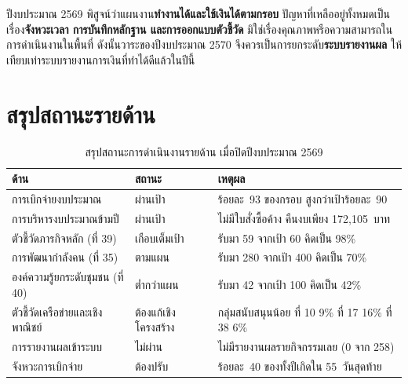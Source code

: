 \begin{tipbox}
ปีงบประมาณ 2569 พิสูจน์ว่าแผนงาน\textbf{ทำงานได้และใช้เงินได้ตามกรอบ}
ปัญหาที่เหลืออยู่ทั้งหมดเป็นเรื่อง\textbf{จังหวะเวลา การบันทึกหลักฐาน และการออกแบบตัวชี้วัด}
มิใช่เรื่องคุณภาพหรือความสามารถในการดำเนินงานในพื้นที่
ดังนั้นวาระของปีงบประมาณ 2570 จึงควรเป็นการยกระดับ\textbf{ระบบรายงานผล}
ให้เทียบเท่าระบบรายงานการเงินที่ทำได้ดีแล้วในปีนี้
\end{tipbox}

\section{สรุปสถานะรายด้าน}

\begin{table}[H]
\centering
\caption{สรุปสถานะการดำเนินงานรายด้าน เมื่อปิดปีงบประมาณ 2569}
\small
\begin{tabular}{L{4.0cm}L{2.3cm}L{7.1cm}}
\toprule
{}
\textbf{ด้าน} & \textbf{สถานะ} & \textbf{เหตุผล}\\
\midrule
การเบิกจ่ายงบประมาณ & ผ่านเป้า & ร้อยละ~93 ของกรอบ สูงกว่าเป้าร้อยละ~90\\
การบริหารงบประมาณข้ามปี & ผ่านเป้า & ไม่มีใบสั่งซื้อค้าง คืนงบเพียง 172,105~บาท\\
ตัวชี้วัดภารกิจหลัก (ที่ 39) & เกือบเต็มเป้า & รับมา 59 จากเป้า 60 คิดเป็น 98\%\\
การพัฒนากำลังคน (ที่ 35) & ตามแผน & รับมา 280 จากเป้า 400 คิดเป็น 70\%\\
องค์ความรู้ยกระดับชุมชน (ที่ 40) & ต่ำกว่าแผน & รับมา 42 จากเป้า 100 คิดเป็น 42\%\\
ตัวชี้วัดเครือข่ายและเชิงพาณิชย์ & ต้องแก้เชิงโครงสร้าง & กลุ่มสนับสนุนน้อย ที่ 10 9\% ที่ 17 16\% ที่ 38 6\%\\
การรายงานผลเข้าระบบ & ไม่ผ่าน & ไม่มีรายงานผลรายกิจกรรมเลย (0 จาก 258)\\
จังหวะการเบิกจ่าย & ต้องปรับ & ร้อยละ~40 ของทั้งปีเกิดใน 55~วันสุดท้าย\\
\bottomrule
\end{tabular}
\end{table}
